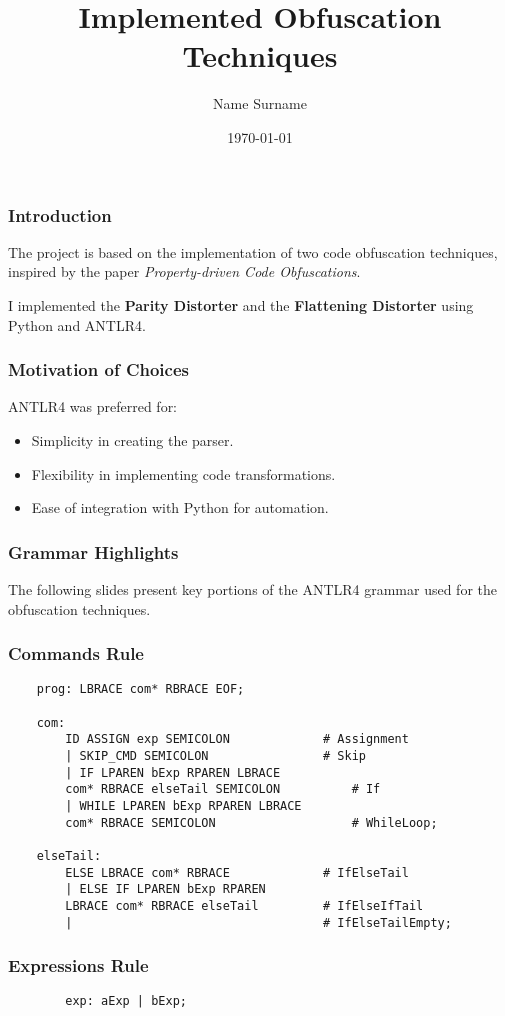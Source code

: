 \documentclass{beamer}
\title{Implemented Obfuscation Techniques}
\author{Name Surname}
\date{\today}
\begin{document}
\begin{frame}
    \titlepage
\end{frame}

\begin{frame}
    \frametitle{Introduction}
    The project is based on the implementation of two code obfuscation techniques, inspired by the paper \textit{Property-driven Code Obfuscations}.

    I implemented the \textbf{Parity Distorter} and the \textbf{Flattening Distorter} using Python and ANTLR4.
\end{frame}

\begin{frame}
    \frametitle{Motivation of Choices}
    ANTLR4 was preferred for:
    \begin{itemize}
        \item Simplicity in creating the parser.
        \item Flexibility in implementing code transformations.
        \item Ease of integration with Python for automation.
    \end{itemize}
\end{frame}

\begin{frame}
    \frametitle{Grammar Highlights}
    The following slides present key portions of the ANTLR4 grammar used for the obfuscation techniques.
\end{frame}

\begin{frame}[fragile]
    \frametitle{Commands Rule}
    \scriptsize
    \begin{verbatim}
    prog: LBRACE com* RBRACE EOF;

    com:
        ID ASSIGN exp SEMICOLON	            # Assignment
        | SKIP_CMD SEMICOLON                # Skip
        | IF LPAREN bExp RPAREN LBRACE 
        com* RBRACE elseTail SEMICOLON          # If
        | WHILE LPAREN bExp RPAREN LBRACE 
        com* RBRACE SEMICOLON                   # WhileLoop;
    
    elseTail:
        ELSE LBRACE com* RBRACE             # IfElseTail
        | ELSE IF LPAREN bExp RPAREN 
        LBRACE com* RBRACE elseTail         # IfElseIfTail
        |                                   # IfElseTailEmpty;
\end{verbatim}
\end{frame}

\begin{frame}[fragile]
    \frametitle{Expressions Rule}
    \scriptsize
    \begin{verbatim}
        exp: aExp | bExp;
    \end{verbatim}
\end{frame}
\end{document}
